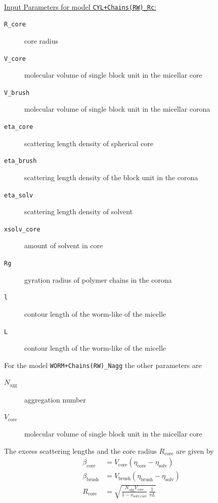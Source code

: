 \hspace{1pt}\\
\uline{Input Parameters for model \texttt{CYL+Chains(RW)\_Rc}:}
\begin{description}
\item[\texttt{R\_core}] core radius
\item[\texttt{V\_core}] molecular volume of single block unit in the micellar core
\item[\texttt{V\_brush}]  molecular volume of single block unit in the micellar corona
\item[\texttt{eta\_core}] scattering length density of spherical core
\item[\texttt{eta\_brush}] scattering length density of the block unit in the corona
\item[\texttt{eta\_solv}] scattering length density of solvent
\item[\texttt{xsolv\_core}] amount of solvent in core
\item[\texttt{Rg}] gyration radius of polymer chains in the corona
\item[\texttt{l}] contour length of the worm-like of the micelle
\item[\texttt{L}] contour length of the worm-like of the micelle
\end{description}

\vspace{10mm}

\noindent
For the model \texttt{WORM+Chains(RW)\_Nagg} the other parameters are
\begin{description}
\item[$N_\text{agg}$] aggregation number
\item[$V_\text{core}$] molecular volume of single block unit in the micellar core
\end{description}
The excess scattering lengths and the core radius $R_\text{core}$ are given by
\begin{align}
\beta_\text{core}  &= V_\text{core}  (\eta_\text{core} -\eta_\text{solv}) \\
\beta_\text{brush} &= V_\text{brush} (\eta_\text{brush}-\eta_\text{solv}) \\
R_\text{core} &= \sqrt{ \frac{N_\text{agg} V_\text{core}}{1-x_\text{solv,core}}
                \, \frac{1}{\pi L}}
\end{align}


